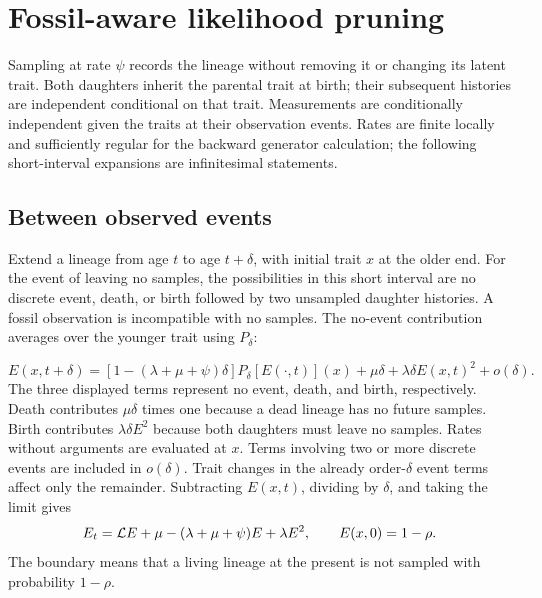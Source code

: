 \documentclass[11pt]{article}
\begin{document}
\section{Fossil-aware likelihood pruning}\label{sec:fossil-likelihood}
Sampling at rate $\psi$ records the lineage without removing it or changing its latent trait.
Both daughters inherit the parental trait at birth; their subsequent histories are independent
conditional on that trait. Measurements are conditionally independent given the traits at their
observation events. Rates are finite locally and sufficiently regular for the backward generator
calculation; the following short-interval expansions are infinitesimal statements.

\subsection{Between observed events}
Extend a lineage from age $t$ to age $t+\delta$, with initial trait $x$ at the older end.
For the event of leaving no samples, the possibilities in this short interval are no discrete
event, death, or birth followed by two unsampled daughter histories. A fossil observation is
incompatible with no samples. The no-event contribution averages over the younger trait using $P_\delta$:

\[
 E(x,t+\delta)
 = [1-(\lambda+\mu+\psi)\delta]P_\delta[E(\cdot,t)](x)
   +\mu\delta+\lambda\delta E(x,t)^2+o(\delta).
\]
The three displayed terms represent no event, death, and birth, respectively. Death contributes
$\mu\delta$ times one because a dead lineage has no future samples. Birth contributes
$\lambda\delta E^2$ because both daughters must leave no samples. Rates without arguments are
evaluated at $x$. Terms involving two or more discrete events are included in $o(\delta)$.
Trait changes in the already order-$\delta$ event terms affect only the remainder. Subtracting
$E(x,t)$, dividing by $\delta$, and taking the limit gives
\begin{equation}\label{eq:E}
 E_t=\mathcal{L} E+\mu-(\lambda+\mu+\psi)E+\lambda E^2,
 \qquad E(x,0)=1-\rho.
\end{equation}
The boundary means that a living lineage at the present is not sampled with probability $1-\rho$.
\end{document}
